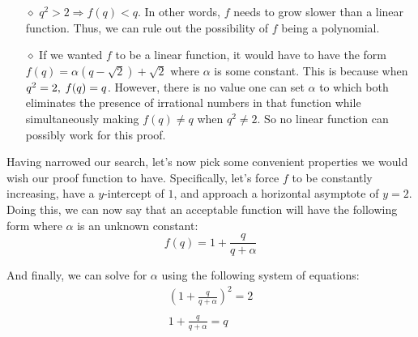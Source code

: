 \documentclass{book}
\newenvironment{myIndent}{%
   \begin{adjustwidth}{2.5em}{0em}%
}{%
   \end{adjustwidth}%
}
\begin{document}
\begin{itemize}
\begin{myIndent}
\begin{itemize}
            \item[$\diamond$] $q^2 > 2 \Rightarrow f(q) < q$. In other
            words, $f$ needs to grow slower than a linear function. Thus,
            we can rule out the possibility of $f$ being a polynomial.
            \hfill \bigbreak

            \item[$\diamond$] If we wanted $f$ to be a linear function,
            it would have to have the form\\ $f(q) = \alpha(q - \sqrt{2})
            + \sqrt{2}$ where $\alpha$ is some constant. This is
            because when $q^2 = 2, \hspace{0.25em} f(q) = q$. However, there
            is no value one can set $\alpha$ to which both eliminates the
            presence of irrational numbers in that function while
            simultaneously making $f(q) \neq q$ when $q^2 \neq 2$. So
            no linear function can possibly work for this proof.
            \hfill \bigbreak
         \end{itemize}

         Having narrowed our search, let's now pick some convenient
         properties we would wish our proof function to have. Specifically,
         let's force $f$ to be constantly increasing, have a $y$-intercept
         of $1$, and approach a horizontal asymptote of $y = 2$. Doing this,
         we can now say that an acceptable function will have the following
         form where $\alpha$ is an unknown constant:
         \[f(q) = 1 + \frac{q}{q + \alpha}\]
         
         And finally, we can solve for $\alpha$ using the following system
         of equations:
         \[\begin{matrix}
            (1 + \frac{q}{q + \alpha})^2 = 2 \\
            \\
            1 + \frac{q}{q + \alpha} = q
         \end{matrix}\]


\end{myIndent}
\end{itemize}
\end{document}
